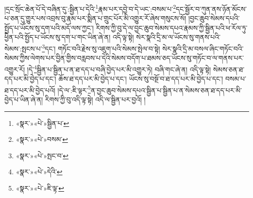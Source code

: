 །དྲང་སྲོང་ཆེན་པོ་དེ་བཞིན་དུ་:སྦྱིན་པ་དེའི་\footnote{«སྣར་»«པེ་»སྦྱིན་པ་}རྣམ་པར་དབྱེ་བ་དེ་ཡང་:བསམ་པ་\footnote{«སྣར་»«པེ་»བསམ་}དང་སྦྱོར་བ་ཀུན་ནས་ཉོན་མོངས་པ་ཅན་དུ་གྱུར་པས་འབྲས་བུ་རྣམ་པར་སྨིན་པ་གྲུང་པོར་མི་འགྱུར་རོ་ཞེས་གསུངས་སོ། །བྱང་ཆུབ་སེམས་དཔའི་སྤྱོད་པ་ཡོངས་སུ་དག་པའི་མདོ་ལས་ཀྱང་། རིགས་ཀྱི་བུ་དེ་ལ་བྱང་ཆུབ་སེམས་དཔའ་རྣམས་ཀྱི་སྦྱིན་པའི་ཕ་རོལ་ཏུ་ཕྱིན་པའི་སྤྱོད་པ་ཡོངས་སུ་དག་པ་གང་ཡིན་ཞེ་ན། འདི་ལྟ་སྟེ། སེར་སྣའི་དྲི་མ་ལ་ཡོངས་སུ་གནས་པའི་སེམས་:སྤངས་པ་\footnote{«སྣར་»«པེ་»སྤང་བ་}དང་། གཏོང་བའི་རྗེས་སུ་འཇུག་པའི་སེམས་སྤེལ་བ་སྟེ། སེར་སྣའི་དྲི་མ་བསལ་ཞིང་གཏོང་བའི་སེམས་ཀྱིས་ལེགས་པར་བྱིན་གྱིས་བརླབས་པ་དེའི་སེམས་བདོག་པ་ཐམས་ཅད་ཡོངས་སུ་གཏོང་བ་ལ་གནས་པར་འགྱུར་རོ། །དེ་\footnote{«སྣར་»«པེ་»དེའི་}སྦྱིན་པ་སྦྱིན་པ་ན་ཐ་དད་པ་བཞི་བྱེད་པར་མི་འགྱུར་ཏེ། བཞི་གང་ཞེ་ན། འདི་ལྟ་སྟེ། སེམས་ཅན་ཐ་དད་པར་མི་བྱེད་པ་དང་། ཆོས་ཐ་དད་པར་མི་བྱེད་པ་དང་། ཡོངས་སུ་བསྔོ་བ་ཐ་དད་པར་མི་བྱེད་པ་དང་། བསམ་པ་ཐ་དད་པར་མི་བྱེད་པའོ། །དེ་ལ་:ཇི་ལྟར་\footnote{«སྣར་»«པེ་»ཇི་ལྟ་}ན་བྱང་ཆུབ་སེམས་དཔའ་སྦྱིན་པ་སྦྱིན་པ་ན་སེམས་ཅན་ཐ་དད་པར་མི་བྱེད་པ་ཡིན་ཞེ་ན། རིགས་ཀྱི་བུ་འདི་ལྟ་སྟེ། འདི་ལ་སྦྱིན་པར་བྱའོ། །
